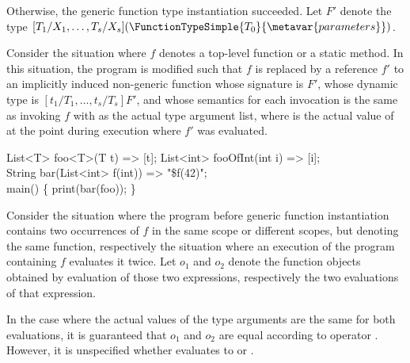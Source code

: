 \documentclass[makeidx]{article}
\begin{document}
{\LMHash{}%
Otherwise, the generic function type instantiation succeeded.
Let $F'$ denote the type
$[T_1/X_1, \ldots, T_s/X_s]%
(\FunctionTypeSimple{T_0}{\metavar{parameters}})$.

\LMHash{}%
Consider the situation where $f$ denotes
a top-level function or a static method.
%
In this situation, the program is modified such that $f$ is replaced by
a reference $f'$ to an implicitly induced non-generic function
whose signature is $F'$,
whose dynamic type is $[t_1/T_1, \ldots, t_s/T_s]F'$,
and whose semantics for each invocation is the same as
invoking $f$ with  as the actual type argument list,
where  is the actual value of 
at the point during execution where $f'$ was evaluated.

\begin{dartCode}
List<T> foo<T>(T t) => [t];
List<int> fooOfInt(int i) => [i];
\\
String bar(List<int> f(int)) => "\${f(42)}";
\\
\VOID{} main() \{
  print(bar(foo));
\}
\end{dartCode}


\LMHash{}%
Consider the situation where the program
before generic function instantiation contains
two occurrences of $f$ in the same scope or different scopes,
but denoting the same function,
respectively the situation where
an execution of the program containing $f$ evaluates it twice.
Let $o_1$ and $o_2$ denote the function objects obtained by
evaluation of those two expressions,
respectively the two evaluations of that expression.

\LMHash{}%
In the case where the actual values of the type arguments
are the same for both evaluations,
it is guaranteed that $o_1$ and $o_2$ are equal
according to operator \lit{==}.
However, it is unspecified whether
 evaluates to \TRUE{} or \FALSE{}.


}
\end{document}
